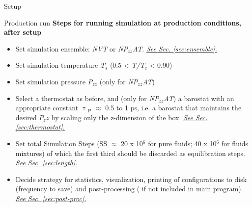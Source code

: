 \documentclass[9pt,bestpractices]{livecoms}
\newcommand{\checkref}[1]{\uline{\emph{{\color{LiveCoMSDarkBlue}#1}}}}
\begin{document}
\begin{Checklists*}[p!]
\begin{checklist}{Setup}
\end{checklist}

\begin{checklist}{Production run}
\textbf{Steps for running simulation at production conditions, after setup}
\begin{itemize}
  \item Set simulation ensemble: \textit{NVT} or \textit{NP}$_{zz}$\textit{AT}. \checkref{See Sec. \ref{sec:ensemble}.} \\
\item Set simulation temperature \textit{T}$_{s}$ (0.5 {\textless} \textit{T/T}$_{c}$ {\textless} 0.90)  \\
\item Set simulation pressure \textit{P}$_{zz}$ (only for \textit{NP}$_{zz}$\textit{AT}) \\
\item Select a thermostat as before, and (only for \textit{NP}$_{zz}$\textit{AT}) a barostat with an appropriate constant ${\uptau}$$_{\mathrm{P}}$ ${\approx}$ 0.5 to 1 ps, i.e. a barostat that maintains the desired $P_zz$ by scaling only the z-dimension of the box. \checkref{See Sec. \ref{sec:thermostat}.}\\
\item Set total Simulation Steps (SS ${\approx}$ 20 x 10$^{6}$ for pure fluids; 40 x 10$^{6}$ for fluids mixtures) of which the first third should be discarded as equilibration steps. \checkref{See Sec. \ref{sec:length}.} \\
\item Decide strategy for statistics, visualization, printing of configurations to disk (frequency to save) and post-processing ( if not included in main program). \checkref{See Sec. \ref{sec:post-proc}.}\\
\end{itemize}
\end{checklist}


\end{Checklists*}
\end{document}
